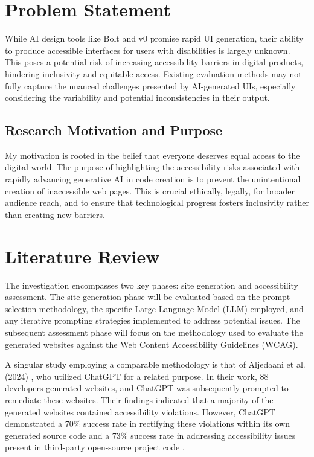\documentclass{article}
\begin{document}
\printacronyms[display=all,heading=section]

\section{Problem Statement}
While AI design tools like Bolt and v0 promise rapid UI generation,
their ability to produce accessible interfaces for users with disabilities is largely unknown.
This poses a potential risk of increasing accessibility barriers in digital products, hindering inclusivity and equitable access.
Existing evaluation methods may not fully capture the nuanced challenges presented by AI-generated UIs, especially considering the variability
and potential inconsistencies in their output.

\subsection{Research Motivation and Purpose}

My motivation is rooted in the belief that everyone deserves equal access to the digital world.
The purpose of highlighting the accessibility risks associated with rapidly advancing generative AI in code creation is
to prevent the unintentional creation of inaccessible web pages.
This is crucial ethically, legally, for broader audience reach, and to ensure that technological progress fosters inclusivity rather than creating new barriers.

\section{Literature Review}
The investigation encompasses two key phases: site generation and accessibility assessment.
The site generation phase will be evaluated based on the prompt selection methodology, the specific Large Language Model (LLM) employed,
and any iterative prompting strategies implemented to address potential issues.
The subsequent assessment phase will focus on the methodology used to evaluate the generated websites against the Web Content Accessibility Guidelines (WCAG).

A singular study employing a comparable methodology is that of Aljedaani et al. (2024) \cite{aljedaani_does_2024}, who utilized ChatGPT for a related purpose.
In their work, 88 developers generated websites, and ChatGPT was subsequently prompted to remediate these websites.
Their findings indicated that a majority of the generated websites contained accessibility violations.
However, ChatGPT demonstrated a 70\% success rate in rectifying these violations within its own generated source code
and a 73\% success rate in addressing accessibility issues present in third-party open-source project code \cite{aljedaani_does_2024}.
\end{document}

